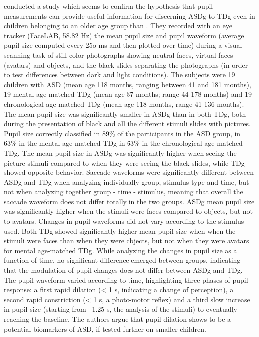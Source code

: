 \cite{martineau2011pupil} conducted a study which seems to confirm the hypothesis that pupil measurements can provide useful information for discerning ASDg to TDg even in children belonging to an older age group than \cite{anderson2006visualscanning}. They recorded with an eye tracker (FaceLAB, 58.82 Hz) the mean pupil size and pupil waveform (average pupil size computed every 25o ms and then plotted over time) during a visual scanning task of still color photographs showing neutral faces, virtual faces (avatars) and objects, and the black slides separating the photographs (in order to test differences between dark and light conditions). The subjects were 19 children with ASD (mean age 118 months, ranging between 41 and 181 months), 19 mental age-matched TDg (mean age 87 months; range 44-178 months) and 19 chronological age-matched TDg (mean age 118 months, range 41-136 months).
The mean pupil size was significantly smaller in ASDg than in both TDg, both during the presentation of black and all the different stimuli slides with pictures. Pupil size correctly classified in 89\% of the participants in the ASD group, in 63\% in the mental age-matched TDg in 63\% in the chronological age-matched TDg. The mean pupil size in ASDg was significantly higher when seeing the picture stimuli compared to when they were seeing the black slides, while TDg showed opposite behavior.
Saccade waveforms were significantly different between ASDg and TDg when analyzing individually group, stimulus type and time, but not when analyzing together group - time - stimulus, meaning that overall the saccade waveform does not differ totally in the two groups.
ASDg mean pupil size was significantly higher when the stimuli were faces compared to objects, but not to avatars. Changes in pupil waveforms did not vary according to the stimulus used.
Both TDg showed significantly higher mean pupil size when when the stimuli were faces than when they were objects, but not when they were avatars for mental age-matched TDg.
While analyzing the changes in pupil size as a function of time, no significant difference emerged between groups, indicating that the modulation of pupil changes does not differ between ASDg and TDg. The pupil waveform varied according to time, highlighting three phases of pupil response: a first rapid dilation (< 1 s, indicating a change of perception), a second rapid constriction (< 1 s, a photo-motor reflex) and a third slow increase in pupil size (starting from ~1.25 s, the analysis of the stimuli) to eventually reaching the baseline.
The authors argue that pupil dilation shows to be a potential biomarkers of ASD, if tested further on smaller children.

